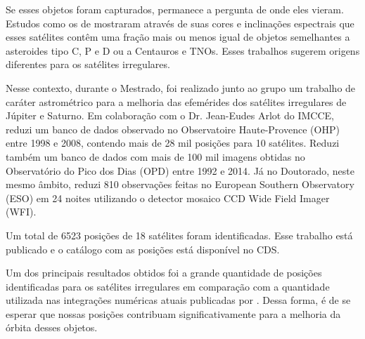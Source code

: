 \documentclass[12pt,a4paper]{report}
\begin{document}


Se esses objetos foram capturados, permanece a pergunta de onde eles vieram. Estudos como os de \citealp{Grav2003, Clark2005, Grav2007} mostraram através de suas cores e inclinações espectrais que esses satélites contêm uma fração mais ou menos igual de objetos semelhantes a asteroides tipo C, P e D ou a Centauros e TNOs. Esses trabalhos sugerem origens diferentes para os satélites irregulares.

Nesse contexto, durante o Mestrado, foi realizado junto ao grupo um trabalho de caráter astrométrico para a melhoria das efemérides dos satélites irregulares de Júpiter e Saturno. Em colaboração com o Dr. Jean-Eudes Arlot do IMCCE, reduzi um banco de dados observado no Observatoire Haute-Provence (OHP) entre 1998 e 2008, contendo mais de 28 mil posições para 10 satélites. Reduzi também um banco de dados com mais de 100 mil imagens obtidas no Observatório do Pico dos Dias (OPD) entre 1992 e 2014. Já no Doutorado, neste mesmo âmbito, reduzi 810 observações feitas no European Southern Observatory (ESO) em 24 noites utilizando o detector mosaico CCD Wide Field Imager (WFI).

Um total de 6523 posições de 18 satélites foram identificadas. Esse trabalho está publicado \citep{GomesJunior2015-Irregular} e o catálogo com as posições está disponível no CDS.

Um dos principais resultados obtidos foi a grande quantidade de posições identificadas para os satélites irregulares em comparação com a quantidade utilizada nas integrações numéricas atuais publicadas por \cite{Jacobson2012}. Dessa forma, é de se esperar que nossas posições contribuam significativamente para a melhoria da órbita desses objetos.
\end{document}
